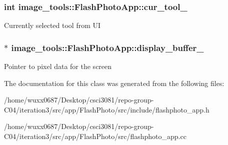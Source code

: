 \subsubsection[{\texorpdfstring{cur\+\_\+tool\+\_\+}{cur_tool_}}]{\setlength{\rightskip}{0pt plus 5cm}int image\+\_\+tools\+::\+Flash\+Photo\+App\+::cur\+\_\+tool\+\_\+\hspace{0.3cm}{\ttfamily [private]}}\hypertarget{classimage__tools_1_1FlashPhotoApp_a1aa3a6b34a072dd47f6b7ab150a52710}{}\label{classimage__tools_1_1FlashPhotoApp_a1aa3a6b34a072dd47f6b7ab150a52710}
Currently selected tool from UI 
\subsubsection[{\texorpdfstring{display\+\_\+buffer\+\_\+}{display_buffer_}}]{$\ast$ image\+\_\+tools\+::\+Flash\+Photo\+App\+::display\+\_\+buffer\+\_\+\hspace{0.3cm}{\ttfamily [private]}}\hypertarget{classimage__tools_1_1FlashPhotoApp_ad0a08d5606cfc5aa02412303147c612d}{}\label{classimage__tools_1_1FlashPhotoApp_ad0a08d5606cfc5aa02412303147c612d}
Pointer to pixel data for the screen 

The documentation for this class was generated from the following files\+:\begin{DoxyCompactItemize}
\item 
/home/wuxx0687/\+Desktop/csci3081/repo-\/group-\/\+C04/iteration3/src/app/\+Flash\+Photo/src/include/flashphoto\+\_\+app.\+h\item 
/home/wuxx0687/\+Desktop/csci3081/repo-\/group-\/\+C04/iteration3/src/app/\+Flash\+Photo/src/flashphoto\+\_\+app.\+cc\end{DoxyCompactItemize}
